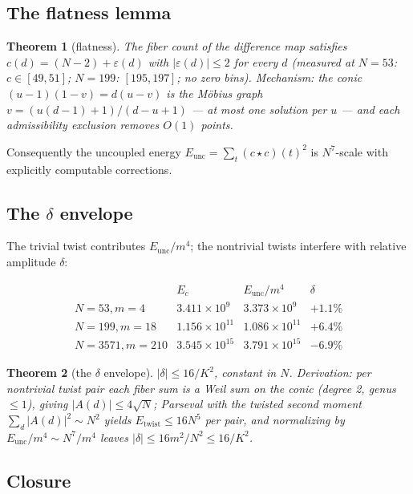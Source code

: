 \documentclass[11pt,reqno]{amsart}
\newtheorem{theorem}{Theorem}[section]
\theoremstyle{definition}
\begin{document}
\subsection{The flatness lemma}

\begin{theorem}[flatness]
\label{thm:flatness}
The fiber count of the difference map satisfies
$c(d) = (N{-}2) + \varepsilon(d)$ with $|\varepsilon(d)| \le 2$ for
every $d$ (measured at $N = 53$: $c \in [49,51]$; $N = 199$:
$[195,197]$; no zero bins).  Mechanism: the conic
$(u{-}1)(1{-}v) = d(u{-}v)$ is the M\"obius graph
$v = (u(d{-}1)+1)/(d{-}u+1)$ — at most one solution per $u$ — and each
admissibility exclusion removes $O(1)$ points.
\end{theorem}

Consequently the uncoupled energy $E_{\mathrm{unc}} =
\sum_t (c \star c)(t)^2$ is $N^7$-scale with explicitly computable
corrections.

\subsection{The \texorpdfstring{$\delta$}{delta} envelope}

The trivial twist contributes $E_{\mathrm{unc}}/m^4$; the nontrivial
twists interfere with relative amplitude $\delta$:

\[
\begin{array}{lccc}
 & E_c & E_{\mathrm{unc}}/m^4 & \delta\\
N = 53, m = 4 & 3.411 \times 10^9 & 3.373 \times 10^9 & +1.1\%\\
N = 199, m = 18 & 1.156 \times 10^{11} & 1.086 \times 10^{11} & +6.4\%\\
N = 3571, m = 210 & 3.545 \times 10^{15} & 3.791 \times 10^{15} & -6.9\%
\end{array}
\]

\begin{theorem}[the $\delta$ envelope]
\label{thm:delta}
$|\delta| \le 16/K^2$, constant in $N$.  Derivation: per nontrivial
twist pair each fiber sum is a Weil sum on the conic (degree 2, genus
$\le 1$), giving $|A(d)| \le 4\sqrt{N}$; Parseval with the twisted
second moment $\sum_d |A(d)|^2 \sim N^2$ yields
$E_{\mathrm{twist}} \le 16 N^5$ per pair, and normalizing by
$E_{\mathrm{unc}}/m^4 \sim N^7/m^4$ leaves $|\delta| \le 16m^2/N^2 \le
16/K^2$.
\end{theorem}

\subsection{Closure}
\end{document}
